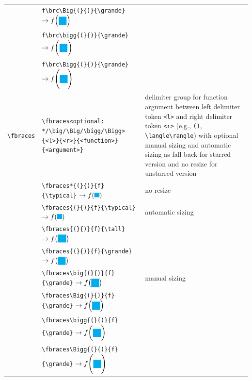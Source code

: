 \documentclass[a4paper,12pt]{article}
\begin{document}
{\begin{longtable}[c]{|L{0.3\textwidth}|L{0.3\textwidth}|L{0.3\textwidth}|}
& \verb|f\brc\Big{(}{)}{\grande}| $\rightarrow f\brc\Big{(}{)}{\grande}$ & \\
& \verb|f\brc\bigg{(}{)}{\grande}| $\rightarrow f\brc\bigg{(}{)}{\grande}$ & \\
& \verb|f\brc\Bigg{(}{)}{\grande}| $\rightarrow f\brc\Bigg{(}{)}{\grande}$ & \\\hline
\verb|\fbraces| & \verb|\fbraces<optional: */\big/\Big/\bigg/\Bigg>{<l>}{<r>}{<function>}{<argument>}| & delimiter group for function argument between left delimiter token \verb|<l>| and right delimiter token \verb|<r>| (e.g., \verb|()|, \verb|\langle\rangle|) with optional manual sizing and automatic sizing as fall back for starred version and no resize for unstarred version \\
& \verb|\fbraces*{(}{)}{f}{\typical}| $\rightarrow \fbraces*{(}{)}{f}{\typical}$ & no resize \\
& \verb|\fbraces{(}{)}{f}{\typical}| $\rightarrow \fbraces{(}{)}{f}{\typical}$ & automatic sizing \\
& \verb|\fbraces{(}{)}{f}{\tall}| $\rightarrow \fbraces{(}{)}{f}{\tall}$ & \\
& \verb|\fbraces{(}{)}{f}{\grande}| $\rightarrow \fbraces{(}{)}{f}{\grande}$ & \\
& \verb|\fbraces\big{(}{)}{f}{\grande}| $\rightarrow \fbraces\big{(}{)}{f}{\grande}$ & manual sizing \\
& \verb|\fbraces\Big{(}{)}{f}{\grande}| $\rightarrow \fbraces\Big{(}{)}{f}{\grande}$ & \\
& \verb|\fbraces\bigg{(}{)}{f}{\grande}| $\rightarrow \fbraces\bigg{(}{)}{f}{\grande}$ & \\
& \verb|\fbraces\Bigg{(}{)}{f}{\grande}| $\rightarrow \fbraces\Bigg{(}{)}{f}{\grande}$ & \\\hline
\end{longtable}
}
\end{document}
